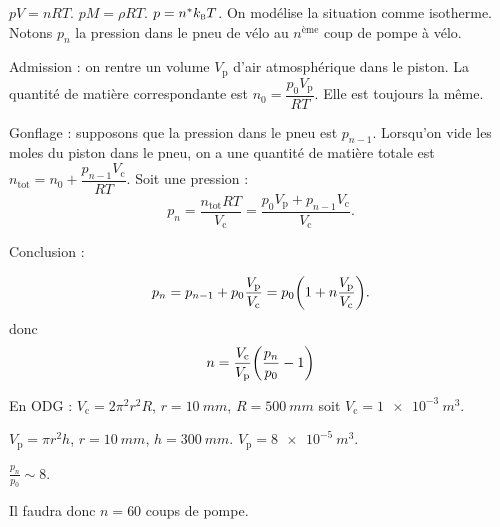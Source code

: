 \begin{solution}
\begin{questions}
    \questioncours $pV = nRT$. $pM = \rho R T$. $p = n^\ast k_\textsc{b} T$.
    \question On modélise la situation comme isotherme. Notons $p_n$ la pression dans le pneu de vélo au $n^\text{ème}$ coup de pompe à vélo.

    \textsf{Admission :} on rentre un volume $V_\text{p}$ d'air atmosphérique dans le piston. La quantité de matière correspondante est $n_0 = \dfrac{p_0 V_\text{p}}{R T}$. Elle est toujours la même.

    \textsf{Gonflage :} supposons que la pression dans le pneu est $p_{n-1}$. Lorsqu'on vide les moles du piston dans le pneu, on a une quantité de matière totale est $n_\text{tot} = n_0 + \dfrac{p_{n-1}V_\text{c}}{RT}$. Soit une pression :
    $$p_n = \dfrac{n_\text{tot}RT}{V_\text{c}} = \dfrac{p_0 V_\text{p} + p_{n-1} V_\text{c}}{V_\text{c}}.$$

    \textsf{Conclusion :}

    $$p_n = p_{n-1} + p_0 \dfrac{V_\text{p}}{V_\text{c}} = p_0 \qty(1 + n \dfrac{V_\text{p}}{V_\text{c}}).$$
    donc
    $$n = \dfrac{V_\text{c}}{V_\text{p}}\qty(\dfrac{p_n}{p_0} - 1)$$

    En ODG : $V_\text{c} = 2\pi^2 r^2 R$, $r = \SI{10}{mm}$, $R = \SI {500}{mm}$ soit $V_\text{c} = \SI{1e-3}{m^3}$.
    
    $V_\text{p} =  \pi r^2 h$, $r = \SI{10}{mm}$, $h = \SI{300}{mm}$. $V_\text{p} = \SI{8e-5}{m^3}$.
    
    $\frac{p_n}{p_0} \sim 8$.

    Il faudra donc $n = 60$ coups de pompe.
    
\end{questions}
\end{solution}



